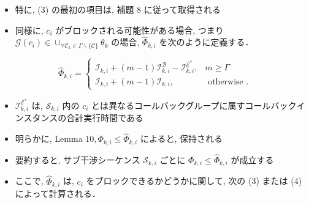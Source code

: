\begin{frame}{}
    \begin{itemize}
        \item 特に, (3) の最初の項目は, 補題 8 に従って取得される
        \item 同様に, $c_{i}$ がブロックされる可能性がある場合, つまり $\mathcal{G}\left(c_{i}\right) \in \cup_{\forall \mathcal{C}_{k} \in \Gamma \backslash\{\mathcal{C}\}} \theta_{k}$ の場合, $\hat{\Phi}_{k, i}$ を次のように定義する．
    \end{itemize}

    \begin{equation*}
        \hat{\Phi}_{k, i}=\left\{\begin{array}{lr}
            \mathcal{I}_{k, i}+(m-1) \mathcal{I}_{k, i}^{\mathcal{B}}-\mathcal{I}_{k, i}^{\mathcal{E}^{*}}, & m \geq \Gamma         \\
            \mathcal{I}_{k, i}+(m-1) \mathcal{I}_{k, i},                                                    & \text { otherwise } .
        \end{array}\right.
    \end{equation*}
\end{frame}

\begin{frame}{}
    \begin{itemize}
        \item $\mathcal{I}_{k, i}^{\mathcal{E}^{*}}$ は, $\mathcal{S}_{k, i}$ 内の $c_{i}$ とは異なるコールバックグループに属すコールバックインスタンスの合計実行時間である
        \item 明らかに, Lemma $10, \Phi_{k, i} \leq \hat{\Phi}_{k, i}$ によると, 保持される
        \item 要約すると, サブ干渉シーケンス $\mathcal{S}_{k, i}$ ごとに $\Phi_{k, i} \leq \hat{\Phi}_{k, i}$ が成立する
        \item ここで, $\hat{\Phi}_{k, i}$ は, $c_{i}$ をブロックできるかどうかに関して, 次の (3) または (4) によって計算される．
    \end{itemize}
\end{frame}

